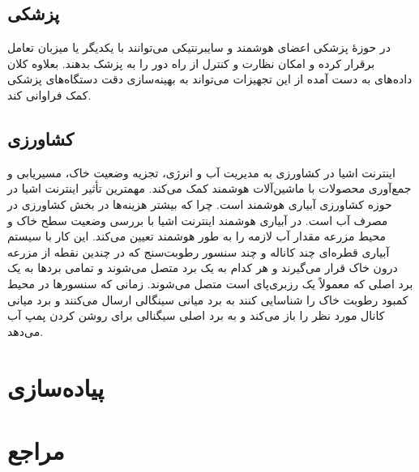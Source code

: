 \documentclass[a4paper]{article}
\begin{document}
\subsection{پزشکی}
در حوزهٔ پزشکی اعضای هوشمند و سایبرنتیکی می‌توانند با یکدیگر یا میزبان تعامل برقرار کرده
و امکان نظارت و کنترل از راه دور را به پزشک بدهند.
بعلاوه کلان داده‌های به دست آمده از این تجهیزات می‌تواند به بهینه‌سازی دقت دستگاه‌های پزشکی کمک فراوانی کند.

\subsection{کشاورزی}
اینترنت اشیا در کشاورزی به مدیریت آب و انرژی، تجزیه وضعیت خاک، مسیریابی و جمع‌آوری محصولات با ماشین‌آلات هوشمند کمک می‌کند.
مهمترین تأثیر اینترنت اشیا در حوزه کشاورزی آبیاری هوشمند است. چرا که بیشتر هزینه‌ها در بخش کشاورزی در مصرف آب است.
در آبیاری هوشمند اینترنت اشیا با بررسی وضعیت سطح خاک و محیط مزرعه مقدار آب لازمه را به طور هوشمند تعیین می‌کند.
این کار با سیستم آبیاری قطره‌ای چند کاناله و چند سنسور رطوبت‌سنج که در چندین نقطه از مزرعه درون خاک قرار می‌گیرند و
هر کدام به یک برد متصل می‌شوند و تمامی بردها به یک برد اصلی که معمولاً یک رزبری‌پای است متصل می‌شوند.
زمانی که سنسورها در محیط کمبود رطوبت خاک را شناسایی کنند به برد میانی سینگالی ارسال می‌کنند و
برد میانی کانال مورد نظر را باز می‌کند و به برد اصلی سیگنالی برای روشن کردن پمپ آب می‌دهد.\cite{javat}

\section{پیاده‌سازی}

\newpage
\section*{مراجع}
\begin{latin}
    \printbibliography[heading=none] %
\end{latin}
\end{document}

